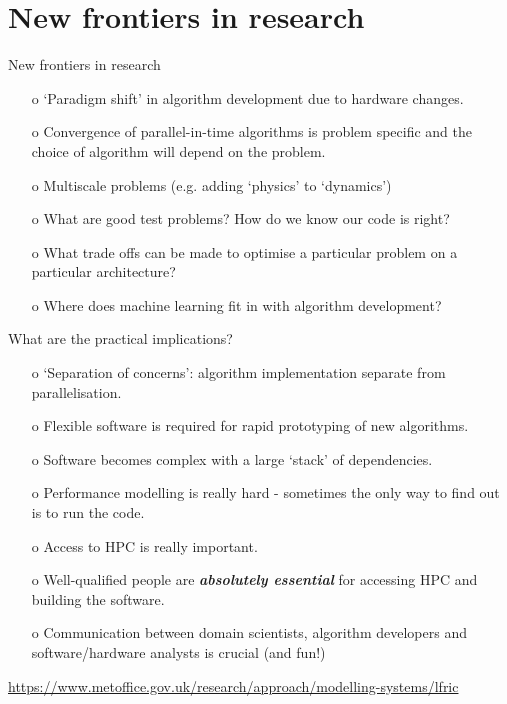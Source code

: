 \documentclass{beamer}
\begin{document}
\section{New frontiers in research}
\begin{frame}{New frontiers in research}
  \begin{itemize}
    \item[o] `Paradigm shift' in algorithm development due to hardware changes.
    \item[o] Convergence of parallel-in-time algorithms is problem specific and the choice of algorithm will depend on the problem.
    \item[o] Multiscale problems (e.g. adding `physics' to `dynamics')
    \item[o] What are good test problems? How do we know our code is right?
    \item[o] What trade offs can be made to optimise a particular problem on a particular architecture?
    \item[o] Where does machine learning fit in with algorithm development?
  \end{itemize}
\end{frame}

\begin{frame}{What are the practical implications?}
  \begin{itemize}
  \item[o] `Separation of concerns': algorithm implementation separate from parallelisation.
  \item[o] Flexible software is required for rapid prototyping of new algorithms.
  \item[o] Software becomes complex with a large `stack' of dependencies.
  \item[o] Performance modelling is really hard - sometimes the only way to find out is to run the code.
  \item[o] Access to HPC is really important.
  \item[o] Well-qualified people are \textbf{\emph{absolutely essential}} for accessing HPC and building the software.
  \item[o] Communication between domain scientists, algorithm developers and software/hardware analysts is crucial (and fun!)
  \end{itemize}
  \url{https://www.metoffice.gov.uk/research/approach/modelling-systems/lfric}
\end{frame}
\end{document}
